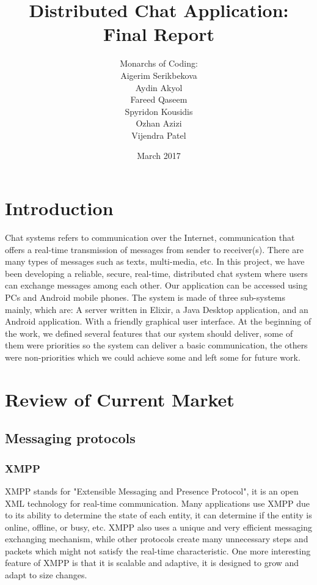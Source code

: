 \documentclass[11pt,a4paper]{report}
\begin{document}
\title{Distributed Chat Application: Final Report}
\author{Monarchs of Coding:\\
  Aigerim Serikbekova\\
  Aydin Akyol\\
  Fareed Qaseem\\
  Spyridon Kousidis\\
  Ozhan Azizi\\
  Vijendra Patel}
\date{March 2017}
\maketitle

\tableofcontents


\chapter{Introduction}

Chat systems refers to communication over the Internet, communication that offers a real-time transmission of messages from sender to receiver(s). There are many types of messages such as texts, multi-media, etc. In this project, we have been developing a reliable, secure, real-time, distributed chat system where users can exchange messages among each other. Our application can be accessed using PCs and Android mobile phones.
The system is made of three sub-systems mainly, which are: A server written in Elixir, a Java Desktop application, and an Android application. With a friendly graphical user interface.
At the beginning of the work, we defined several features that our system should deliver, some of them were priorities so the system can deliver a basic communication, the others were non-priorities which we could achieve some and left some for future work.

\chapter{Review of Current Market}


\section{Messaging protocols}

\subsection{XMPP}
XMPP stands for "Extensible Messaging and Presence Protocol", it is an open XML technology for real-time communication. Many applications use XMPP due to its ability to determine the state of each entity, it can determine if the entity is online, offline, or busy, etc. XMPP also uses a unique and very efficient messaging exchanging mechanism, while other protocols create many unnecessary steps and packets which might not satisfy the real-time characteristic. One more interesting feature of XMPP is that it is scalable and adaptive, it is designed to grow and adapt to size changes.
\end{document}
